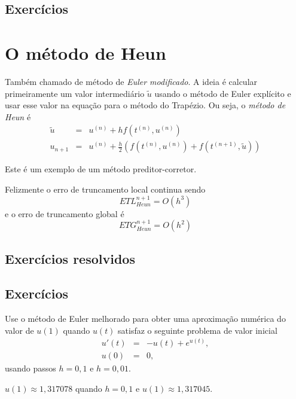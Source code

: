 \emconstrucao

\subsection*{Exercícios}

\emconstrucao


\section{O método de Heun}
Também chamado de método de \emph{Euler modificado}. A ideia é calcular primeiramente um valor intermediário $\tilde{u}$ usando o método de Euler expl\'icito e usar esse valor na equação para o método do Trapézio. Ou seja, o \emph{método de Heun} é
\begin{eqnarray}
  \tilde{u} &=& u^{(n)} +   h f(t^{(n)},u^{(n)}) \\
  u_{n+1}   &=& u^{(n)} +  \frac{h}{2} \left(f(t^{(n)},u^{(n)})+f(t^{(n+1)},\tilde{u})\right)
\end{eqnarray}

Este é um exemplo de um método preditor-corretor.

Felizmente o erro de truncamento local continua sendo
\begin{equation} ETL_{Heun}^{n+1}= O(h^3) \end{equation}
e o erro de truncamento global é
\begin{equation} ETG_{Heun}^{n+1}= O(h^2) \end{equation}


\subsection*{Exercícios resolvidos}

\emconstrucao

\subsection*{Exercícios}

\begin{exer} Use o método de Euler melhorado para obter uma aproximação numérica do valor de $u(1)$ quando $u(t)$ satisfaz o seguinte problema de valor inicial
\begin{eqnarray*}
 u'(t)&=&-u(t)+ e^{u(t)},\\
 u(0)&=&0,
\end{eqnarray*}
usando passos $h=0,1$ e $h=0,01$.
\end{exer}
\begin{resp}
 $u(1)\approx 1,317078$ quando $h=0,1$ e $u(1)\approx 1,317045$.
\end{resp}


